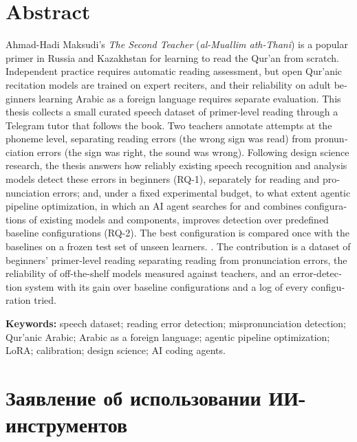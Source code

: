 \chapter*{\textenglish{Abstract}}
\thispagestyle{plain}
\begin{otherlanguage}{english}

Ahmad-Hadi Maksudi's \emph{The Second Teacher} (\emph{al-Muallim ath-Thani}) is a popular primer in Russia
and Kazakhstan for learning to read the Qur'an from scratch. Independent practice requires automatic reading
assessment, but open Qur'anic recitation models are trained on expert reciters, and their reliability on adult
beginners learning Arabic as a foreign language requires separate evaluation. This thesis collects a small
curated speech dataset of primer-level reading through a Telegram tutor that follows the book. Two teachers annotate attempts at the phoneme level, separating reading errors (the wrong sign was
read) from pronunciation errors (the sign was right, the sound was wrong). Following design science research,
the thesis answers how reliably existing speech recognition and analysis models detect these errors in
beginners (RQ-1), separately for reading and pronunciation errors; and, under a fixed experimental budget, to what extent
agentic pipeline optimization, in which an AI agent searches for and combines configurations of existing models
and components, improves detection over predefined baseline configurations (RQ-2). The best configuration is
compared once with the baselines on a frozen test set of unseen learners.
. The
contribution is a dataset of beginners' primer-level reading separating reading from pronunciation errors, the
reliability of off-the-shelf models measured against teachers, and an error-detection system with its gain
over baseline configurations and a log of every configuration tried.

\medskip
\noindent\textbf{Keywords:} speech dataset; reading error detection; mispronunciation detection; Qur'anic
Arabic; Arabic as a foreign language; agentic pipeline optimization; LoRA; calibration; design
science; AI coding agents.
\end{otherlanguage}

\chapter*{Заявление об использовании ИИ-инструментов}
\thispagestyle{plain}

